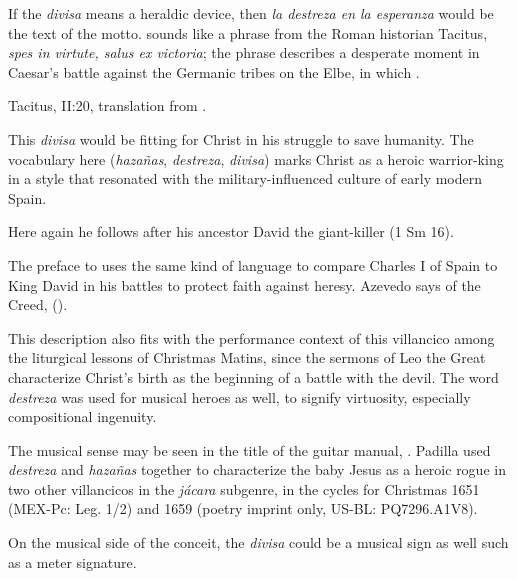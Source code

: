 If the \emph{divisa} means a heraldic device, then \emph{la destreza en la
esperanza} would be the text of the motto.
 sounds like a phrase from the Roman historian
Tacitus, \emph{spes in virtute, salus ex victoria}; the phrase describes a
desperate moment in Caesar's battle against the Germanic tribes on the Elbe, in
which .%
\begin{Footnote}
    Tacitus,  II:20, translation from
    \autocite[49]{Tacitus:Annales-English}.
\end{Footnote}
This \emph{divisa} would be fitting for Christ in his struggle to save humanity.
The vocabulary here (\emph{hazañas}, \emph{destreza}, \emph{divisa}) marks
Christ as a heroic warrior-king in a style that resonated with the
military-influenced culture of early modern Spain. 

Here again he follows after his ancestor David the giant-killer (1 Sm 16).%
\begin{Footnote}
    The preface to \autocite{Azevedo:Catecismo} uses the same kind of language
    to compare Charles I of Spain to King David in his battles to protect faith
    against heresy. 
    Azevedo says of the Creed,  ().
\end{Footnote}
This description also fits with the performance context of this villancico among
the liturgical lessons of Christmas Matins, since the sermons of Leo the Great
characterize Christ's birth as the beginning of a battle with the devil.
The word \emph{destreza} was used for musical heroes as well, to signify
virtuosity, especially compositional ingenuity.%
\begin{Footnote}
    \Autocite
    [: ]
    {Covarrubias:Tesoro}
    The musical sense may be seen in the title of the guitar manual,
    \autocite{Sanz:Guitarra}.
    Padilla used \emph{destreza} and \emph{hazañas} together to characterize the
    baby Jesus as a heroic rogue in two other villancicos in the \emph{jácara}
    subgenre, in the cycles for Christmas 1651 (MEX-Pc: Leg. 1/2) and 1659
    (poetry imprint only, US-BL: PQ7296.A1V8).
\end{Footnote}
On the musical side of the conceit, the \emph{divisa} could be a musical sign as
well such as a meter signature.

